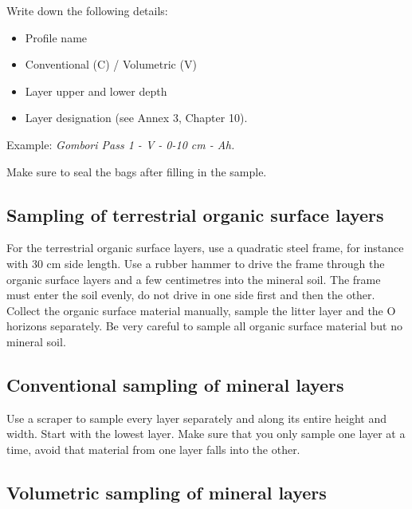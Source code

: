 \documentclass[
  letterpaper,
  DIV=11,
  numbers=noendperiod]{scrreprt}
\providecommand{\tightlist}{%
  \setlength{\itemsep}{0pt}\setlength{\parskip}{0pt}}\usepackage{longtable,booktabs,array}
\begin{document}
Write down the following details:

\begin{itemize}
\tightlist
\item
  Profile name
\item
  Conventional (C) / Volumetric (V)
\item
  Layer upper and lower depth
\item
  Layer designation (see Annex 3, Chapter 10).
\end{itemize}

Example: \emph{Gombori Pass 1 - V - 0-10 cm - Ah.}

Make sure to seal the bags after filling in the sample.

\hypertarget{sampling-of-terrestrial-organic-surface-layers}{%
\subsection{Sampling of terrestrial organic surface
layers}\label{sampling-of-terrestrial-organic-surface-layers}}

For the terrestrial organic surface layers, use a quadratic steel frame,
for instance with 30 cm side length. Use a rubber hammer to drive the
frame through the organic surface layers and a few centimetres into the
mineral soil. The frame must enter the soil evenly, do not drive in one
side first and then the other. Collect the organic surface material
manually, sample the litter layer and the O horizons separately. Be very
careful to sample all organic surface material but no mineral soil.

\hypertarget{conventional-sampling-of-mineral-layers}{%
\subsection{Conventional sampling of mineral
layers}\label{conventional-sampling-of-mineral-layers}}

Use a scraper to sample every layer separately and along its entire
height and width. Start with the lowest layer. Make sure that you only
sample one layer at a time, avoid that material from one layer falls
into the other.

\hypertarget{volumetric-sampling-of-mineral-layers}{%
\subsection{Volumetric sampling of mineral
layers}\label{volumetric-sampling-of-mineral-layers}}
\end{document}
